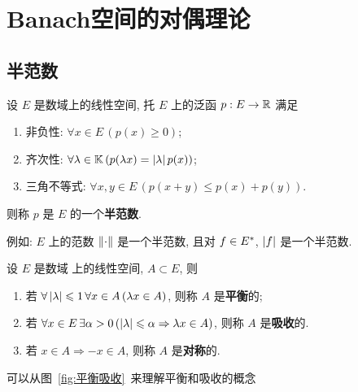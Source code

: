 
\chapter{Banach空间的对偶理论}
\section{半范数}
	\begin{Definition}[半范数]\label{def:半范数}
		设 $ E $ 是数域\K 上的线性空间, 托 $ E $ 上的泛函 $ p : E\to \mathbb{R} $ 满足
		\begin{enumerate}[(1)]
			\item 非负性: $ \forall x\in E\,(p(x)\geqslant0) $;
			\item 齐次性: $ \forall \lambda\in\mathbb{K}\,(p(\lambda x)=\left| \lambda \right| p(x)) $;
			\item 三角不等式: $ \forall x, y\in E\,(p(x+y)\leqslant p(x)+p(y)) $.
		\end{enumerate}
		则称 $ p $ 是 $ E $ 的一个\textbf{半范数}. 
	\end{Definition}
	例如: $ E $ 上的范数 $ \left\| \cdot \right\| $ 是一个半范数, 且对 $ f\in E^{*} $, $ \left| f \right|  $ 是一个半范数.
	\begin{Definition}[平衡, 吸收]\label{def:平衡吸收}
		设 $ E $ 是数域 \K 上的线性空间, $ A\subset E $, 则
		\begin{enumerate}[(1)]
			\item 若 $ \forall\left| \lambda \right| \leqslant1\,\forall x\in A\,(\lambda x\in A) $, 则称 $ A $ 是\textbf{平衡}的;
			\item 若 $ \forall x\in E\,\exists \alpha>0\,(\left| \lambda \right| \leqslant\alpha\Rightarrow\lambda x \in A) $, 则称 $ A $ 是\textbf{吸收}的. 
			\item 若 $ x\in A\Rightarrow -x\in A $, 则称 $ A $ 是\textbf{对称}的.  
		\end{enumerate}
	\end{Definition}
	可以从图~\ref{fig:平衡吸收}~来理解平衡和吸收的概念
